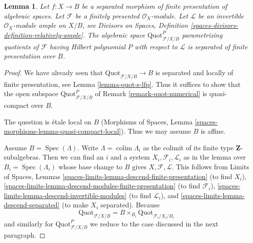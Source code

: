 \documentclass{stacks-project}
\theoremstyle{plain}
\newtheorem{lemma}[subsection]{Lemma}
\theoremstyle{definition}
\theoremstyle{remark}
\numberwithin{equation}{subsection}
\def\colim{\mathop{\mathrm{colim}}\nolimits}
\def\Spec{\mathop{\mathrm{Spec}}}
\def\Quotfunctor{\mathrm{Quot}}
\begin{document}
\begin{lemma}
\label{lemma-quot-qc-over-base}
Let $f : X \to B$ be a separated morphism of finite presentation
of algebraic spaces. Let $\mathcal{F}$ be a finitely presented
$\mathcal{O}_X$-module. Let $\mathcal{L}$ be an invertible
$\mathcal{O}_X$-module ample on $X/B$, see
Divisors on Spaces, Definition
\ref{spaces-divisors-definition-relatively-ample}.
The algebraic space $\Quotfunctor^P_{\mathcal{F}/X/B}$
parametrizing quotients of $\mathcal{F}$
having Hilbert polynomial $P$ with respect to $\mathcal{L}$
is separated of finite presentation over $B$.
\end{lemma}

\begin{proof}
We have already seen that $\Quotfunctor_{\mathcal{F}/X/B} \to B$
is separated and locally of finite presentation, see
Lemma \ref{lemma-quot-s-lfp}. Thus it suffices to show that
the open subspace $\Quotfunctor^P_{\mathcal{F}/X/B}$
of Remark \ref{remark-quot-numerical} is quasi-compact over $B$.

\medskip\noindent
The question is \'etale local on $B$
(Morphisms of Spaces, Lemma \ref{spaces-morphisms-lemma-quasi-compact-local}).
Thus we may assume $B$ is affine.

\medskip\noindent
Assume $B = \Spec(\Lambda)$. Write $\Lambda = \colim \Lambda_i$ as the
colimit of its finite type $\mathbf{Z}$-subalgebras. Then
we can find an $i$ and a system $X_i, \mathcal{F}_i, \mathcal{L}_i$
as in the lemma over $B_i = \Spec(\Lambda_i)$ whose base change to
$B$ gives $X, \mathcal{F}, \mathcal{L}$.
This follows from
Limits of Spaces, Lemmas
\ref{spaces-limits-lemma-descend-finite-presentation} (to find $X_i$),
\ref{spaces-limits-lemma-descend-modules-finite-presentation} (to find
$\mathcal{F}_i$), \ref{spaces-limits-lemma-descend-invertible-modules}
(to find $\mathcal{L}_i$), and \ref{spaces-limits-lemma-descend-separated}
(to make $X_i$ separated). Because
$$
\Quotfunctor_{\mathcal{F}/X/B} = B \times_{B_i}
\Quotfunctor_{\mathcal{F}_i/X_i/B_i}
$$
and similarly for $\Quotfunctor^P_{\mathcal{F}/X/B}$ we reduce
to the case discussed in the next paragraph.


\end{proof}
\end{document}
